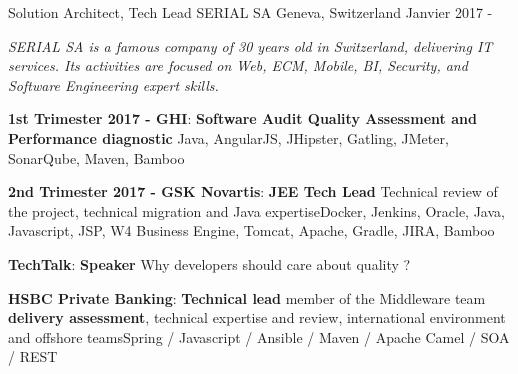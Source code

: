 

\begin{cventries}

\cventry
{Solution Architect, Tech Lead} %
{SERIAL SA} %
{Geneva, Switzerland} %
{Janvier 2017 - } %
{
	\begin{cvitems} %
		\item {\textit{SERIAL SA is a famous company of 30 years old in Switzerland, delivering IT services. Its activities are focused on Web, ECM, Mobile, BI, Security, and Software Engineering expert skills.}}
		\item { \textbf{1st Trimester 2017 - GHI}: \textbf{Software Audit Quality Assessment and Performance diagnostic} \newline Java, AngularJS, JHipster, Gatling, JMeter, SonarQube, Maven, Bamboo}
		\item { \textbf{2nd Trimester 2017 - GSK Novartis}: \textbf{JEE Tech Lead} \newline Technical review of the project, technical migration and Java expertise\newline Docker, Jenkins, Oracle, Java, Javascript, JSP, W4 Business Engine, Tomcat, Apache, Gradle, JIRA, Bamboo}	
		\item { \textbf{TechTalk}: \textbf{Speaker} \newline Why developers should care about quality ?}		
		\item { \textbf{HSBC Private Banking}: \textbf{Technical lead} \newline member of the Middleware team  \textbf{delivery assessment}, technical expertise and review, international environment and offshore teams\newline Spring / Javascript / Ansible / Maven / Apache Camel / SOA / REST}		
	\end{cvitems}
}


\end{cventries}
